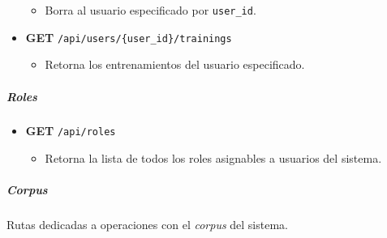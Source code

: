 \documentclass[12pt,a4paper,]{scrartcl}
\providecommand{\tightlist}{%
  \setlength{\itemsep}{0pt}\setlength{\parskip}{0pt}}
\let\oldsubparagraph\subparagraph
\renewcommand{\subparagraph}[1]{\oldsubparagraph{#1}\mbox{}}
\begin{document}
\begin{itemize}
  \begin{itemize}
  \tightlist
  \item
    Borra al usuario especificado por \texttt{user\_id}.
  \end{itemize}
\item
  \textbf{GET} \texttt{/api/users/\{user\_id\}/trainings}

  \begin{itemize}
  \tightlist
  \item
    Retorna los entrenamientos del usuario especificado.
  \end{itemize}
\end{itemize}

\hypertarget{roles}{%
\subparagraph{Roles}\label{roles}}

\begin{itemize}
\tightlist
\item
  \textbf{GET} \texttt{/api/roles}

  \begin{itemize}
  \tightlist
  \item
    Retorna la lista de todos los roles asignables a usuarios del sistema.
  \end{itemize}
\end{itemize}

\hypertarget{corpus-2}{%
\subparagraph{Corpus}\label{corpus-2}}

Rutas dedicadas a operaciones con el \emph{corpus} del sistema.
\end{document}

